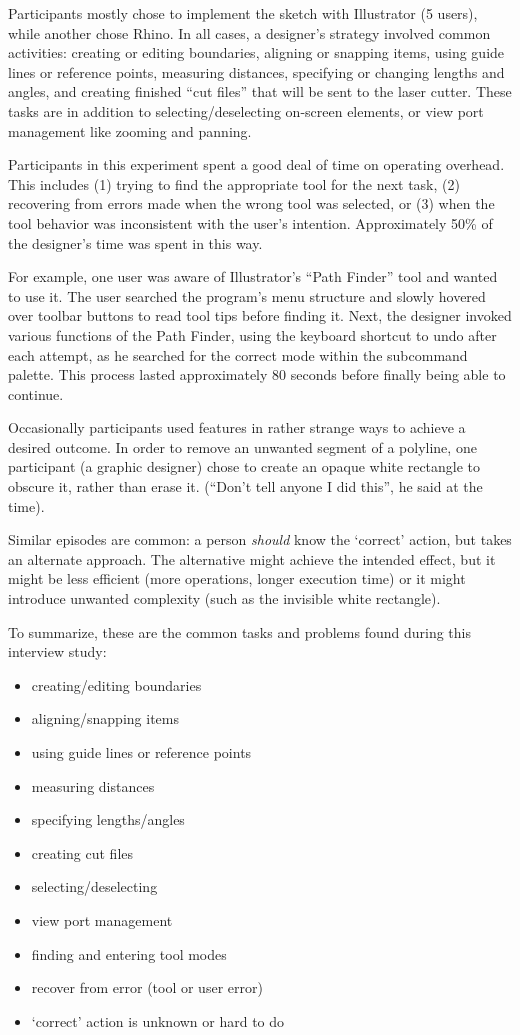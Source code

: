 \documentclass{article}
\begin{document}
Participants mostly chose to implement the sketch with Illustrator (5
users), while another chose Rhino. In all cases, a designer's strategy
involved common activities: creating or editing boundaries, aligning
or snapping items, using guide lines or reference points, measuring
distances, specifying or changing lengths and angles, and creating
finished ``cut files'' that will be sent to the laser cutter. These
tasks are in addition to selecting/deselecting on-screen elements, or
view port management like zooming and panning.

Participants in this experiment spent a good deal of time on operating
overhead. This includes (1) trying to find the appropriate tool for
the next task, (2) recovering from errors made when the wrong tool was
selected, or (3) when the tool behavior was inconsistent with the
user's intention. Approximately 50\% of the designer's time was spent
in this way.

For example, one user was aware of Illustrator's ``Path Finder'' tool
and wanted to use it. The user searched the program's menu structure
and slowly hovered over toolbar buttons to read tool tips before
finding it. Next, the designer invoked various functions of the Path
Finder, using the keyboard shortcut to undo after each attempt, as he
searched for the correct mode within the subcommand palette. This
process lasted approximately 80 seconds before finally being able to
continue.

Occasionally participants used features in rather strange ways to
achieve a desired outcome. In order to remove an unwanted segment of a
polyline, one participant (a graphic designer) chose to create an
opaque white rectangle to obscure it, rather than erase it. (``Don't
tell anyone I did this'', he said at the time). 

Similar episodes are common: a person \textit{should} know the
`correct' action, but takes an alternate approach. The alternative
might achieve the intended effect, but it might be less efficient
(more operations, longer execution time) or it might introduce
unwanted complexity (such as the invisible white rectangle).

To summarize, these are the common tasks and problems found during
this interview study:

\begin{itemize}
\item creating/editing boundaries
\item aligning/snapping items
\item using guide lines or reference points
\item measuring distances
\item specifying lengths/angles
\item creating cut files
\item selecting/deselecting
\item view port management
\item finding and entering tool modes
\item recover from error (tool or user error)
\item `correct' action is unknown or hard to do
\end{itemize}
\end{document}
